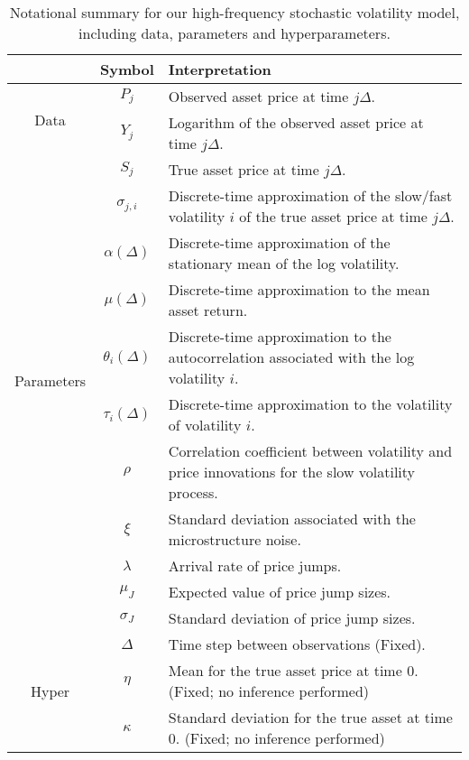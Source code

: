 \begin{table}[h!]
\begin{center}
\begin{tabular}{c|c|p{10cm}}
&  Symbol   &   Interpretation  \\ \hline \hline
\multirow{2}{*}{\begin{sideways} Data \end{sideways}} &  $P_j$   &   Observed asset price at time $j\Delta$.  \\
&  $Y_j$   &   Logarithm of the observed asset price at time $j\Delta$.  \\ \hline
\multirow{10}{*}{\begin{sideways} Parameters \end{sideways}} &  $S_j$   &   True asset price at time $j\Delta$.  \\
&  $\sigma_{j,i}$   &   Discrete-time approximation of the slow/fast volatility $i$ of the true asset price at time $j\Delta$.  \\
&  $\alpha(\Delta)$   &   Discrete-time approximation of the stationary mean of the log volatility.  \\
&  $\mu(\Delta)$   &  Discrete-time approximation to the mean asset return.  \\
&  $\theta_i(\Delta)$   &  Discrete-time approximation to the autocorrelation associated with the log volatility $i$.  \\
&  $\tau_i(\Delta)$   &  Discrete-time approximation to the volatility of volatility $i$.  \\
&  $\rho$   &  Correlation coefficient between volatility and price innovations for the slow volatility process.  \\
  &  $\xi$     &   Standard deviation associated with the microstructure noise.  \\
  & $\lambda$ & Arrival rate of price jumps. \\
  & $\mu_J$ & Expected value of price jump sizes. \\
  & $\sigma_J$ & Standard deviation of price jump sizes. \\ \hline
\multirow{4}{*}{\begin{sideways} Hyper \end{sideways}} &  $\Delta$   &  Time step between observations (Fixed).  \\
&  $\eta$   &  Mean for the true asset price at time 0. (Fixed; no inference performed)  \\
&  $\kappa$   &  Standard deviation for the true asset at time 0. (Fixed; no inference performed) \\
\end{tabular}
\caption{Notational summary for our high-frequency stochastic volatility model, including data, parameters and hyperparameters.}\label{ta:parameters}
\end{center}
\end{table}


